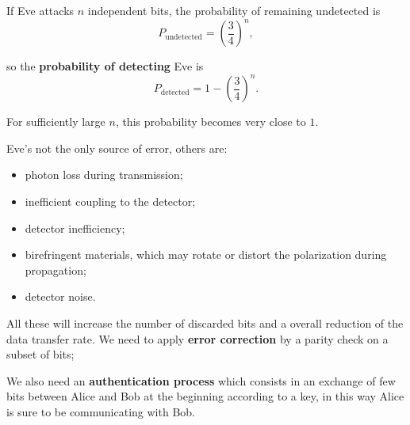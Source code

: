 If Eve attacks $n$ independent bits, the probability of remaining undetected is
\[
P_{\text{undetected}} = \left(\frac{3}{4}\right)^n,
\]

so the \textbf{probability of detecting} Eve is
\[
P_{\text{detected}} = 1 - \left(\frac{3}{4}\right)^n.
\]

For sufficiently large $n$, this probability becomes very close to $1$.

Eve's not the only source of error, others are:
\begin{itemize}
    \item photon loss during transmission;
    \item inefficient coupling to the detector;
    \item detector inefficiency;
    \item birefringent materials, which may rotate or distort the polarization during propagation;
    \item detector noise.
\end{itemize}

All these will increase the number of discarded bits and a overall reduction of the data transfer rate. We need to apply \textbf{error correction} by a parity check on a subset of bits;


We also need an \textbf{authentication process} which consists in an exchange of few bits between Alice and Bob at the beginning according to a key, in this way Alice is sure to be communicating with Bob.